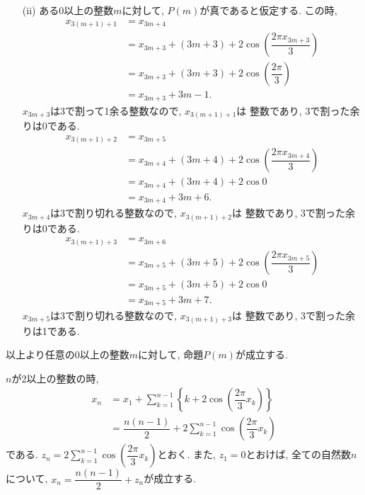 \documentclass[dvipdfmx,a4paper]{jsarticle}
\begin{document}
\begin{itemize}
        \item [(ii)] ある0以上の整数$m$に対して, $P(m)$が真であると仮定する. 
        この時, 
        \begin{align*}
            x_{3 (m+1) + 1} &= x_{3m + 4} \\
            &= x_{3m+3} + (3m+3) + 2\cos\left( \dfrac{2\pi x_{3m+3}}{3} \right)\\
            &= x_{3m+3} + (3m+3) + 2\cos\left( \dfrac{2\pi}{3} \right) \\
            &= x_{3m+3} + 3m -1.
        \end{align*}
        $x_{3m+3}$は3で割って1余る整数なので, $x_{3 (m+1) + 1}$は
        整数であり, 3で割った余りは0である. 
        \begin{align*}
            x_{3 (m+1) + 2} &= x_{3m + 5} \\
            &= x_{3m+4} + (3m+4) + 2\cos\left( \dfrac{2\pi x_{3m+4}}{3} \right)\\
            &= x_{3m+4} + (3m+4) + 2\cos 0 \\
            &= x_{3m+4} + 3m + 6.
        \end{align*}
        $x_{3m+4}$は3で割り切れる整数なので, $x_{3 (m+1) + 2}$は
        整数であり, 3で割った余りは0である. 
        \begin{align*}
            x_{3 (m+1) + 3} &= x_{3m + 6} \\
            &= x_{3m+5} + (3m+5) + 2\cos\left( \dfrac{2\pi x_{3m+5}}{3} \right)\\
            &= x_{3m+5} + (3m+5) + 2\cos 0 \\
            &= x_{3m+5} + 3m + 7.
        \end{align*}
        $x_{3m+5}$は3で割り切れる整数なので, $x_{3 (m+1) + 3}$は
        整数であり, 3で割った余りは1である. 
        
    \end{itemize}

    以上より任意の0以上の整数$m$に対して, 命題$P(m)$が成立する. 

    $n$が2以上の整数の時, 
    \begin{align*} \displaystyle
        x_n 
        &= x_1 + \sum_{k=1}^{n-1} \left\{k + 2 \cos \left( \dfrac{2\pi}{3}x_k\right)\right\} \\
        &= \dfrac{n(n-1)}{2} + 2 \sum_{k=1}^{n-1} \cos \left( \dfrac{2\pi}{3}x_k\right)
    \end{align*}
    である. $\displaystyle z_n = 2 \sum_{k=1}^{n-1} \cos \left( \dfrac{2\pi}{3}x_k\right)$とおく. 
    また, $z_1 = 0$とおけば, 全ての自然数$n$について, $x_n = \dfrac{n(n-1)}{2} + z_n$が成立する. 
\end{document}
